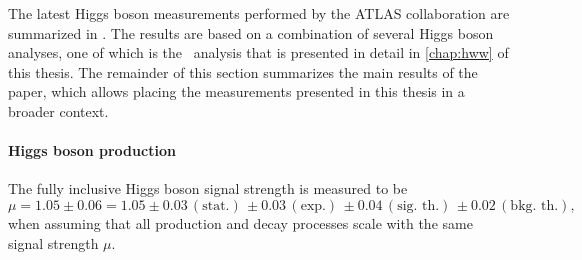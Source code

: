 The latest Higgs boson measurements performed by the ATLAS collaboration are summarized in .
The results are based on a combination of several Higgs boson analyses, one of which is the \HWW\ analysis that is presented in detail in \cref{chap:hww} of this thesis. 
The remainder of this section summarizes the main results of the paper, which allows placing the measurements presented in this thesis in a broader context. 


\paragraph{Higgs boson production}
The fully inclusive Higgs boson signal strength is measured to be \cite{NaturePaper}
\begin{equation*}
   \mu =1.05 \pm 0.06 = 1.05\pm 0.03\, (\text{stat.})\, \pm 0.03\, (\text{exp.})\, \pm 0.04\, (\text{sig.\ th.})\, \pm 0.02\, (\text{bkg.\ th.}),
\end{equation*}
when assuming that all production and decay processes scale with the same signal strength $\mu$.

